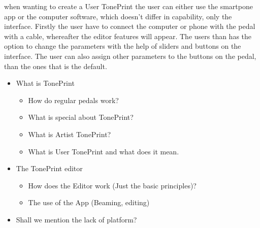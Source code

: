 when wanting to create a User TonePrint the user can either use the smartpone app or the computer software, which doesn't differ in capability, only the interface. Firstly the user have to connect the computer or phone with the pedal with a cable, whereafter the editor features will appear. The users than has the option to change the parameters with the help of sliders and buttons on the interface. The user can also assign other parameters to the buttons on the pedal, than the ones that is the default. 


\begin{itemize}
  \item What is TonePrint
  \begin{itemize}
    \item How do regular pedals work?
    \item What is special about TonePrint?
    \item What is Artist TonePrint?
    \item What is User TonePrint and what does it mean.
  \end{itemize}
  \item The TonePrint editor
  \begin{itemize}
    \item How does the Editor work (Just the basic principles)?
    \item The use of the App (Beaming, editing)
  \end{itemize}
  \item Shall we mention the lack of platform?
\end{itemize}






